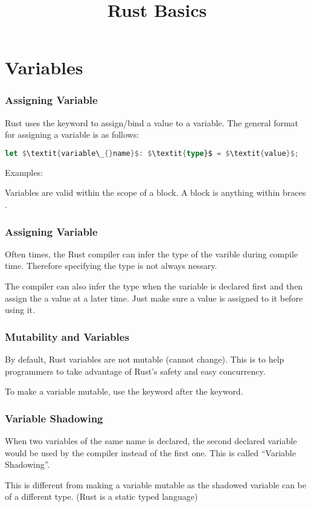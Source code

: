 \documentclass{beamer}
\title{Rust Basics}
\begin{document}
\begin{frame}
  \titlepage{}
\end{frame}

\section{Variables}
\begin{frame}[fragile]
  \frametitle{Assigning Variable}
  Rust uses the  keyword to assign/bind a value to a variable. The general format for assigning a variable is as follows:

\begin{lstlisting}[mathescape=true, language=Rust]
let $\textit{variable\_{}name}$: $\textit{type}$ = $\textit{value}$;
\end{lstlisting}

  Examples:
  

  Variables are valid within the scope of a block. A block is anything within braces \inlinecode{\{\}}.
\end{frame}

\begin{frame}[fragile]
  \frametitle{Assigning Variable}
  Often times, the Rust compiler can infer the type of the varible during compile time. Therefore specifying the type is not always nessary.
  

  The compiler can also infer the type when the variable is declared first and then assign the a value at a later time. Just make sure a value is assigned to it before using it.
  
\end{frame}

\begin{frame}
  \frametitle{Mutability and Variables}
  By default, Rust variables are not mutable (cannot change). This is to help programmers to take advantage of Rust's safety and easy concurrency.
  

  To make a variable mutable, use the  keyword after the  keyword.
  
\end{frame}

\begin{frame}
  \frametitle{Variable Shadowing}
  When two variables of the same name is declared, the second declared variable would be used by the compiler instead of the first one. This is called ``Variable Shadowing''.
  

  This is different from making a variable mutable as the shadowed variable can be of a different type. (Rust is a static typed language)
\end{frame}
\end{document}
